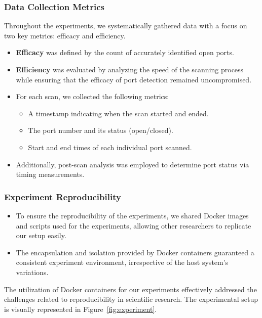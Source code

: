 \subsubsection{Data Collection Metrics}

Throughout the experiments, we systematically gathered data with a focus on two key metrics: efficacy and efficiency.

\begin{itemize}
    \item \textbf{Efficacy} was defined by the count of accurately identified open ports.
    \item \textbf{Efficiency} was evaluated by analyzing the speed of the scanning process while ensuring that the efficacy of port detection remained uncompromised.
    \item For each scan, we collected the following metrics:
    \begin{itemize}
        \item A timestamp indicating when the scan started and ended.
        \item The port number and its status (open/closed).
        \item Start and end times of each individual port scanned.
    \end{itemize}
    \item Additionally, post-scan analysis was employed to determine port status via timing measurements.
\end{itemize}

\subsubsection{Experiment Reproducibility}
\begin{itemize}
    \item To ensure the reproducibility of the experiments, we shared Docker images and scripts used for the experiments, allowing other researchers to replicate our setup easily.
    \item The encapsulation and isolation provided by Docker containers guaranteed a consistent experiment environment, irrespective of the host system's variations.
\end{itemize}

The utilization of Docker containers for our experiments effectively addressed the challenges related to reproducibility in scientific research. The experimental setup is visually represented in Figure~\ref{fig:experiment}.

